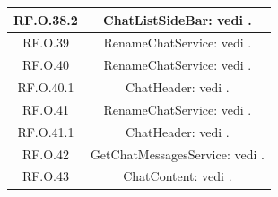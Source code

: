 \documentclass[10pt, a4paper]{article}
\begin{document}
\begin{xltabular}{\textwidth}{c|c}
\hline
RF.O.38.2 &  ChatListSideBar: vedi . \\
\hline
RF.O.39 & RenameChatService: vedi .\\
\hline
RF.O.40 &  RenameChatService: vedi . \\
\hline
RF.O.40.1 & ChatHeader: vedi . \\
\hline
RF.O.41 &  RenameChatService: vedi . \\
\hline
RF.O.41.1 & ChatHeader: vedi .\\
\hline
RF.O.42 & GetChatMessagesService: vedi .\\
\hline
RF.O.43 & ChatContent: vedi .\\


\end{xltabular}
\end{document}
